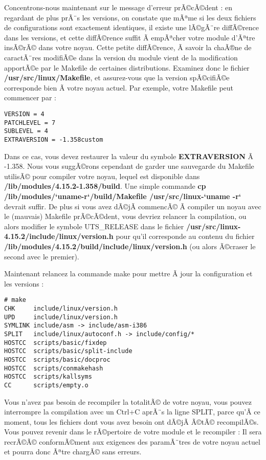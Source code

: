 \documentclass[11pt]{article}
\begin{document}
Concentrons-nous maintenant sur le message d'erreur prÃ©cÃ©dent : en regardant de plus prÃ¨s les versions, on constate que mÃªme si les deux fichiers de configurations sont exactement identiques, il existe une lÃ©gÃ¨re diffÃ©rence dans les versions, et cette diffÃ©rence suffit Ã  empÃªcher votre module d'Ãªtre insÃ©rÃ© dans votre noyau. Cette petite diffÃ©rence, Ã  savoir la chaÃ®ne de caractÃ¨res modifiÃ©e dans la version du module vient de la modification apportÃ©e par le Makefile de certaines distributions. Examinez donc le fichier \textbf{/usr/src/linux/Makefile}, et assurez-vous que la version spÃ©cifiÃ©e corresponde bien Ã  votre noyau actuel. Par exemple, votre Makefile peut commencer par :

\begin{verbatim}
VERSION = 4
PATCHLEVEL = 7
SUBLEVEL = 4
EXTRAVERSION = -1.358custom
\end{verbatim}

Dans ce cas, vous devez restaurer la valeur du symbole \textbf{EXTRAVERSION} Ã  -1.358. Nous vous suggÃ©rons cependant de garder une sauvegarde du Makefile utilisÃ© pour compiler votre noyau, lequel est disponible dans \textbf{/lib/modules/4.15.2-1.358/build}. Une simple commande \textbf{cp /lib/modules/`uname-r`/build/Makefile /usr/src/linux-`uname -r`} devrait suffir. De plus si vous avez dÃ©jÃ  commencÃ© Ã  compiler un noyau avec le (mauvais) Makefile prÃ©cÃ©dent, vous devriez relancer la compilation, ou alors modifier le symbole UTS\_RELEASE dans le fichier \textbf{/usr/src/linux-4.15.2/include/linux/version.h} pour qu'il corresponde au contenu du fichier \textbf{/lib/modules/4.15.2/build/include/linux/version.h} (ou alors Ã©craser le second avec le premier).

Maintenant relancez la commande make pour mettre Ã  jour la configuration et les versions :

\begin{verbatim}
# make
CHK     include/linux/version.h
UPD     include/linux/version.h
SYMLINK include/asm -> include/asm-i386
SPLIT   include/linux/autoconf.h -> include/config/*
HOSTCC  scripts/basic/fixdep
HOSTCC  scripts/basic/split-include
HOSTCC  scripts/basic/docproc
HOSTCC  scripts/conmakehash
HOSTCC  scripts/kallsyms
CC      scripts/empty.o
\end{verbatim}

Vous n'avez pas besoin de recompiler la totalitÃ© de votre noyau, vous pouvez interrompre la compilation avec un Ctrl+C aprÃ¨s la ligne SPLIT, parce qu'Ã  ce moment, tous les fichiers dont vous avez besoin ont dÃ©jÃ  Ã©tÃ© recompilÃ©s. Vous pouvez revenir dans le rÃ©pertoire de votre module et le recompiler : Il sera recrÃ©Ã© conformÃ©ment aux exigences des paramÃ¨tres de votre noyau actuel et pourra donc Ãªtre chargÃ© sans erreurs.
\end{document}
